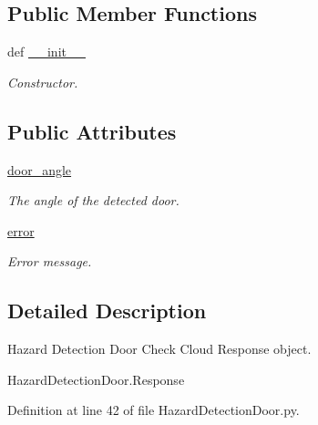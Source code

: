 \subsection*{Public Member Functions}
\begin{DoxyCompactItemize}
\item 
def \hyperlink{classRappCloud_1_1CloudMsgs_1_1HazardDetectionDoor_1_1HazardDetectionDoor_1_1Response_a6599b67eb04bb000da788b375b84bc0c}{\-\_\-\-\_\-init\-\_\-\-\_\-}
\begin{DoxyCompactList}\small\item\em Constructor. \end{DoxyCompactList}\end{DoxyCompactItemize}
\subsection*{Public Attributes}
\begin{DoxyCompactItemize}
\item 
\hyperlink{classRappCloud_1_1CloudMsgs_1_1HazardDetectionDoor_1_1HazardDetectionDoor_1_1Response_a235e046c21b539cb0702fbc26d1d9043}{door\-\_\-angle}
\begin{DoxyCompactList}\small\item\em The angle of the detected door. \end{DoxyCompactList}\item 
\hyperlink{classRappCloud_1_1CloudMsgs_1_1HazardDetectionDoor_1_1HazardDetectionDoor_1_1Response_a122f14665538bcff10f50d4bd2ace299}{error}
\begin{DoxyCompactList}\small\item\em Error message. \end{DoxyCompactList}\end{DoxyCompactItemize}


\subsection{Detailed Description}
\begin{DoxyVerb}Hazard Detection Door Check Cloud Response object.

HazardDetectionDoor.Response
\end{DoxyVerb}
 

Definition at line 42 of file Hazard\-Detection\-Door.\-py.



